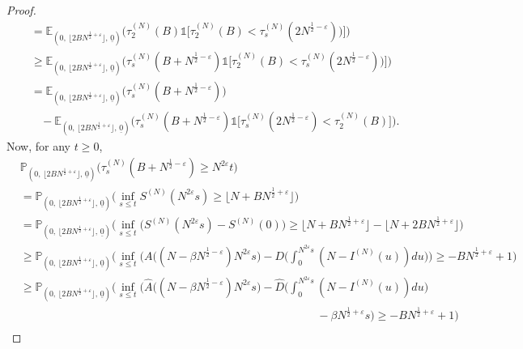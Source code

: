 \documentclass[11pt, reqno]{article}
\numberwithin{equation}{section}
\numberwithin{theorem}{section}
\begin{document}
\begin{proof}
\begin{align}
    &= \mathbb{E}_{(0, \, \lfloor 2BN^{\frac{1}{2}+\varepsilon} \rfloor, \,\underline{0})}\big(\tau^{(N)}_2(B)\mathds{1}\big[\tau^{(N)}_2(B) < \tau^{(N)}_s(2N^{\frac{1}{2}-\varepsilon}))\big]\big)\nonumber\\
    &\geq \mathbb{E}_{(0, \, \lfloor 2BN^{\frac{1}{2}+\varepsilon} \rfloor, \,\underline{0})}\big(\tau^{(N)}_{s}(B+N^{\frac{1}{2}-\varepsilon})\mathds{1}\big[\tau^{(N)}_2(B) < \tau^{(N)}_s(2N^{\frac{1}{2}-\varepsilon}))\big]\big)\nonumber\\
    &=\mathbb{E}_{(0, \, \lfloor 2BN^{\frac{1}{2}+\varepsilon} \rfloor, \,\underline{0})}\big(\tau^{(N)}_s(B+N^{\frac{1}{2}-\varepsilon})\big)\nonumber\\
    &\ \ \ \ -\mathbb{E}_{(0, \, \lfloor 2BN^{\frac{1}{2}+\varepsilon} \rfloor, \,\underline{0})}\big(\tau_s^{(N)}(B+N^{\frac{1}{2}-\varepsilon})\mathds{1}\big[\tau_s^{(N)}(2N^{\frac{1}{2}-\varepsilon})<\tau_2^{(N)}(B)\big]\big).
\end{align}
Now, 
for any $t\geq 0$,
\begin{align*}
    &\mathbb{P}_{(0, \, \lfloor 2BN^{\frac{1}{2}+\varepsilon} \rfloor, \,\underline{0})}\big(\tau^{(N)}_s(B+N^{\frac{1}{2}-\varepsilon}) \ge N^{2\varepsilon}t\big)\\
    &= \mathbb{P}_{(0, \, \lfloor 2BN^{\frac{1}{2}+\varepsilon} \rfloor, \,\underline{0})}\big(\inf_{s\leq t}S^{(N)}(N^{2\varepsilon}s)\geq \lfloor N+ BN^{\frac{1}{2}+\varepsilon} \rfloor\big)\\
    &= \mathbb{P}_{(0, \, \lfloor 2BN^{\frac{1}{2}+\varepsilon} \rfloor, \,\underline{0})}\big(\inf_{s\leq t}\big(S^{(N)}(N^{2\varepsilon}s)-S^{(N)}(0)\big)\geq \lfloor N+ BN^{\frac{1}{2}+\varepsilon} \rfloor- \lfloor N+2 BN^{\frac{1}{2}+\varepsilon}\rfloor\big)\\
    &\ge \mathbb{P}_{(0, \, \lfloor 2BN^{\frac{1}{2}+\varepsilon} \rfloor, \,\underline{0})}\Big(\inf_{s\leq t}\big(A((N-\beta N^{\frac{1}{2}-\varepsilon})N^{2\varepsilon}s\big)-D\big(\int_0^{N^{2\varepsilon}s}(N-I^{(N)}(u))du\big)\big)\geq -B N^{\frac{1}{2}+\varepsilon} + 1\Big) 
\end{align*}
\begin{align*}
    &\geq  \mathbb{P}_{(0, \, \lfloor 2BN^{\frac{1}{2}+\varepsilon} \rfloor, \,\underline{0})}\big(\inf_{s\leq t}\big(\hat{A}\big((N-\beta N^{\frac{1}{2}-\varepsilon})N^{2\varepsilon}s\big)-\hat{D}\big(\int_0^{N^{2\varepsilon}s}(N-I^{(N)}(u))du\big)\\
    &\hspace{11cm}-\beta N^{\frac{1}{2}+\varepsilon}s\big)\geq -BN^{\frac{1}{2}+\varepsilon} + 1\big)\\

\end{align*}
\end{proof}
\end{document}
